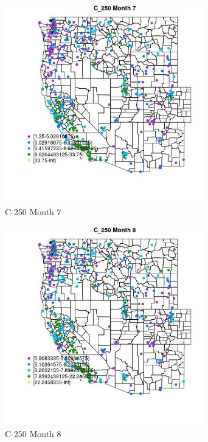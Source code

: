 \begin{figure} 
\centering  
\includegraphics[width=0.77\textwidth]{Code_Outputs/ML_input_report_ML_input_PM25_Step5_part_d_de_duplicated_aves_ML_input_MapObsMo7C_250.jpg} 
\caption{\label{fig:ML_input_report_ML_input_PM25_Step5_part_d_de_duplicated_aves_ML_inputMapObsMo7C_250}C-250 Month 7} 
\end{figure} 
 

\begin{figure} 
\centering  
\includegraphics[width=0.77\textwidth]{Code_Outputs/ML_input_report_ML_input_PM25_Step5_part_d_de_duplicated_aves_ML_input_MapObsMo8C_250.jpg} 
\caption{\label{fig:ML_input_report_ML_input_PM25_Step5_part_d_de_duplicated_aves_ML_inputMapObsMo8C_250}C-250 Month 8} 
\end{figure} 
 

